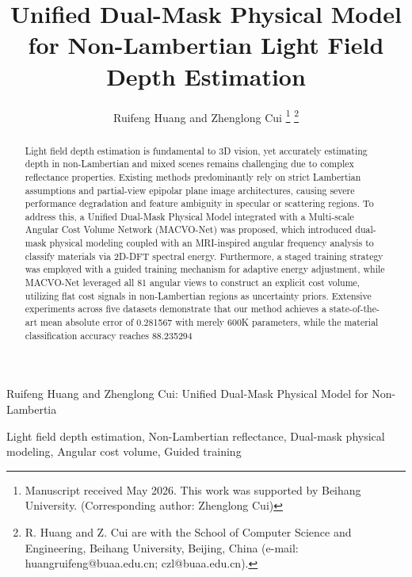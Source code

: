 \documentclass[lettersize,journal]{IEEEtran}
\begin{document}
\title{Unified Dual-Mask Physical Model for Non-Lambertian Light Field Depth Estimation}

\author{Ruifeng Huang and Zhenglong Cui
\thanks{Manuscript received May 2026. This work was supported by Beihang University. (Corresponding author: Zhenglong Cui)}
\thanks{R. Huang and Z. Cui are with the School of Computer Science and Engineering, Beihang University, Beijing, China (e-mail: huangruifeng@buaa.edu.cn; czl@buaa.edu.cn).}}

%
{Ruifeng Huang and Zhenglong Cui: Unified Dual-Mask Physical Model for Non-Lambertia}

\maketitle

\begin{abstract}
Light field depth estimation is fundamental to 3D vision, yet accurately estimating depth in non-Lambertian and mixed scenes remains challenging due to complex reflectance properties. Existing methods predominantly rely on strict Lambertian assumptions and partial-view epipolar plane image architectures, causing severe performance degradation and feature ambiguity in specular or scattering regions. To address this, a Unified Dual-Mask Physical Model integrated with a Multi-scale Angular Cost Volume Network (MACVO-Net) was proposed, which introduced dual-mask physical modeling coupled with an MRI-inspired angular frequency analysis to classify materials via 2D-DFT spectral energy. Furthermore, a staged training strategy was employed with a guided training mechanism for adaptive energy adjustment, while MACVO-Net leveraged all 81 angular views to construct an explicit cost volume, utilizing flat cost signals in non-Lambertian regions as uncertainty priors. Extensive experiments across five datasets demonstrate that our method achieves a state-of-the-art mean absolute error of 0.281567 with merely 600K parameters, while the material classification accuracy reaches 88.235294%
\end{abstract}

\begin{IEEEkeywords}
Light field depth estimation, Non-Lambertian reflectance, Dual-mask physical modeling, Angular cost volume, Guided training
\end{IEEEkeywords}
\end{document}
